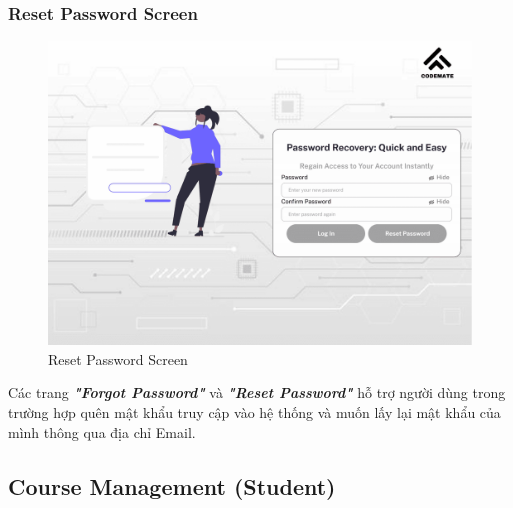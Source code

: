 \subsubsection{Reset Password Screen}
\begin{figure}[H]
    \centering
    \includegraphics[width=0.7\linewidth]{Images/figmaDesign/Reset Password Screen.png}
    \caption{Reset Password Screen}
    \label{fig:enter-label}
\end{figure}
Các trang \textbf{\textit{"Forgot Password"}} và \textbf{\textit{"Reset Password"}} hỗ trợ người dùng trong trường hợp quên mật khẩu truy cập vào hệ thống và muốn lấy lại mật khẩu của mình thông qua địa chỉ Email. 
\subsection{Course Management (Student)}
